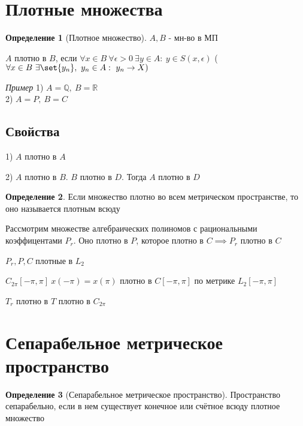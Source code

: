 \documentclass[a4paper]{article}
\DeclarePairedDelimiter\set\{\}
\theoremstyle{definition}
\newtheorem*{definition}{Определение}
\theoremstyle{remark}
\begin{document}
\section*{\centering Плотные множества}

\begin{tcolorbox}
    \begin{definition}[Плотное множество]
        $ A,B $ - мн-во в МП

        $ A $ плотно в $ B $, если $ \forall x \in B \ \forall \epsilon > 0 \ 
        \exists y \in A: \ y \in S(x,\epsilon)$ ($ \forall x \in B \ \exists
        \set{y_n}, \ y_n \in A: \ y_n \to X )$ 
    \end{definition}
\end{tcolorbox}

\emph{Пример} 1) $ A = \mathbb{Q}, \ B = \mathbb{R} $ \\
2) $ A = P, \ B = C $ 

\subsection*{Свойства}
1) $ A $ плотно в $ A $ 

2) $ A $ плотно в $ B $. $ B $ плотно в $ D $. Тогда $ A $ плотно в $ D $  

\begin{tcolorbox}
    \begin{definition}
        Если множество плотно во всем метрическом пространстве, то оно называется
        плотным всюду
    \end{definition}
\end{tcolorbox}

Рассмотрим множестве алгебраических полиномов с рациональными коэффицентами $ P_r $.
Оно плотно в $ P $, которое плотно в $ C \implies P_r$ плотно в $ C $  

$ P_r, P, C $ плотные в $ L_2 $ 

$ C_{2\pi}[-\pi, \pi] \ x(-\pi) = x(\pi) $ плотно в $ C[-\pi, \pi] $ по
метрике $ L_2[-\pi, \pi] $ 

$ T_r $ плотно в $ T $ плотно в $ C_{2\pi} $ 

\section*{\centering Сепарабельное метрическое пространство}
\begin{tcolorbox}
    \begin{definition}[Сепарабельное метрическое пространство]
        Пространство сепарабельно, если в нем существует конечное или счётное
        всюду плотное множество
    \end{definition}
\end{tcolorbox}
\end{document}
